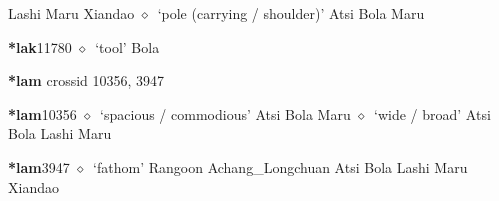 \begin{list}{}{\leftmargin=1.5em \itemindent=-1.5em}
         Lashi 
\hspace{1ex}
         Maru 
\hspace{1ex}
         Xiandao 
\hspace{1ex}
         $\diamond$~`pole (carrying / shoulder)'
         Atsi 
\hspace{1ex}
         Bola 
\hspace{1ex}
         Maru 
  \item {\footnotesize \textbf{*lak}}{\tiny 11780}
\hspace{1ex}
         $\diamond$~`tool'
         Bola 
  \end{list}
\item
\textbf{*lam}
  {\tiny crossid 10356, 3947}
  \begin{list}{}{\leftmargin=1.5em \itemindent=-1.5em}
  \item {\footnotesize \textbf{*lam}}{\tiny 10356}
         $\diamond$~`spacious / commodious'
         Atsi 
\hspace{1ex}
         Bola 
\hspace{1ex}
         Maru 
\hspace{1ex}
         $\diamond$~`wide / broad'
         Atsi 
\hspace{1ex}
         Bola 
\hspace{1ex}
         Lashi 
\hspace{1ex}
         Maru 
  \item {\footnotesize \textbf{*lam}}{\tiny 3947}
\hspace{1ex}
         $\diamond$~`fathom'
         Rangoon 
\hspace{1ex}
         Achang\_Longchuan 
\hspace{1ex}
         Atsi 
\hspace{1ex}
         Bola 
\hspace{1ex}
         Lashi 
\hspace{1ex}
         Maru 
\hspace{1ex}
         Xiandao 
  \end{list}
